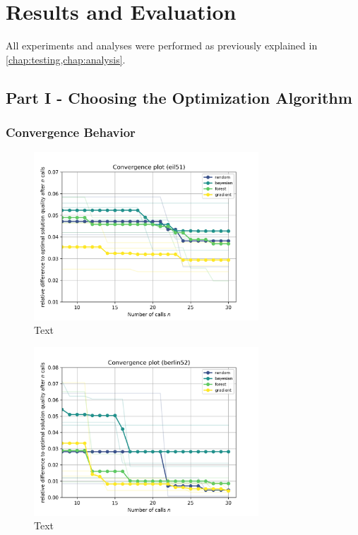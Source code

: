 

\chapter{Results and Evaluation}
\label{chap:results}

All experiments and analyses were performed as previously explained in \cref{chap:testing,chap:analysis}.

\section{Part I - Choosing the Optimization Algorithm}
\label{chap:part1}

\subsection{Convergence Behavior}

\begin{figure}[h]
	\centering
	\includegraphics[width=0.75\textwidth]{results/part1/convergence_eil51.png}
	\caption{Text}
	\label{fig:convergence_eil51}
\end{figure}

\begin{figure}[h]
	\centering
	\includegraphics[width=0.75\textwidth]{results/part1/convergence_berlin52.png}
	\caption{Text}
	\label{fig:convergence_berlin52}
\end{figure}

